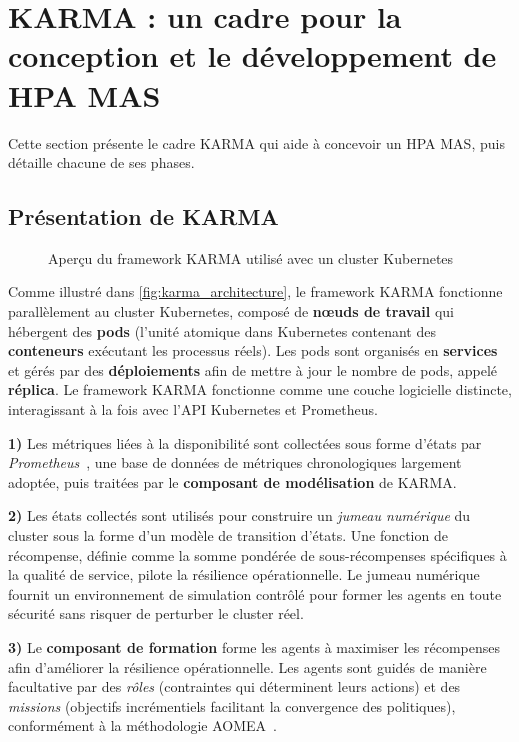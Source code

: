 \section{KARMA : un cadre pour la conception et le développement de HPA MAS}
\label{sec:approche_proposée}

\label{sec:approche_proposée}

Cette section présente le cadre KARMA qui aide à concevoir un HPA MAS, puis détaille chacune de ses phases.

\subsection{Présentation de KARMA}

\begin{figure}[h!]
    \centering
    
    \caption{Aperçu du framework KARMA utilisé avec un cluster Kubernetes}
    \label{fig:karma_architecture}
\end{figure}

Comme illustré dans \autoref{fig:karma_architecture}, le framework KARMA fonctionne parallèlement au cluster Kubernetes, composé de \textbf{nœuds de travail} qui hébergent des \textbf{pods} (l'unité atomique dans Kubernetes contenant des \textbf{conteneurs} exécutant les processus réels). Les pods sont organisés en \textbf{services} et gérés par des \textbf{déploiements} afin de mettre à jour le nombre de pods, appelé \textbf{réplica}. Le framework KARMA fonctionne comme une couche logicielle distincte, interagissant à la fois avec l'API Kubernetes et Prometheus.

\textbf{1)} Les métriques liées à la disponibilité sont collectées sous forme d'états par \textit{Prometheus}~\cite{prometheus}, une base de données de métriques chronologiques largement adoptée, puis traitées par le \textbf{composant de modélisation} de KARMA.

\textbf{2)} Les états collectés sont utilisés pour construire un \textit{jumeau numérique} du cluster sous la forme d'un modèle de transition d'états. Une fonction de récompense, définie comme la somme pondérée de sous-récompenses spécifiques à la qualité de service, pilote la résilience opérationnelle. Le jumeau numérique fournit un environnement de simulation contrôlé pour former les agents en toute sécurité sans risquer de perturber le cluster réel.

\textbf{3)} Le \textbf{composant de formation} forme les agents à maximiser les récompenses afin d'améliorer la résilience opérationnelle. Les agents sont guidés de manière facultative par des \textit{rôles} (contraintes qui déterminent leurs actions) et des \textit{missions} (objectifs incrémentiels facilitant la convergence des politiques), conformément à la méthodologie AOMEA~\cite{soule2024aomea}.

